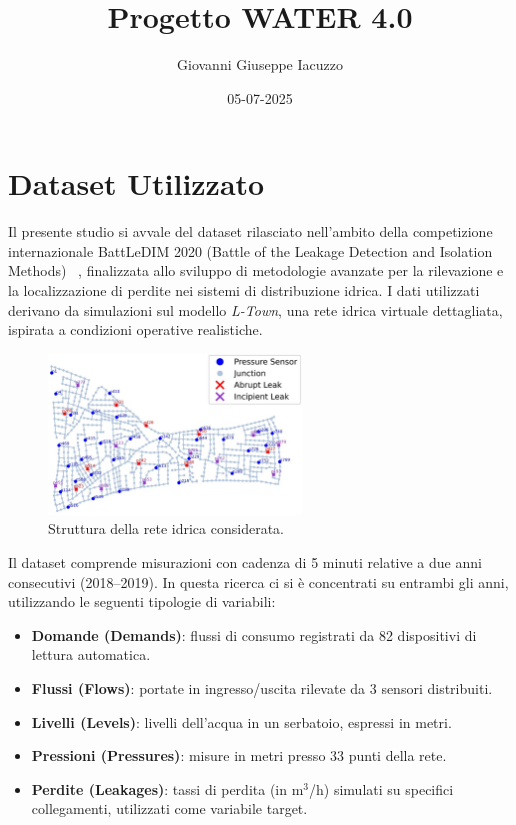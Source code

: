 \documentclass{article}
\title{Progetto WATER 4.0}
\author{Giovanni Giuseppe Iacuzzo}
\date{05-07-2025}
\begin{document}
\maketitle

\section{Dataset Utilizzato}

Il presente studio si avvale del dataset rilasciato nell'ambito della competizione internazionale BattLeDIM 2020 (Battle of the Leakage Detection and Isolation Methods) ~\cite{battle2020}, finalizzata allo sviluppo di metodologie avanzate per la rilevazione e la localizzazione di perdite nei sistemi di distribuzione idrica. I dati utilizzati derivano da simulazioni sul modello \emph{L-Town}, una rete idrica virtuale dettagliata, ispirata a condizioni operative realistiche.

\begin{figure}[htbp]
    \centering
    \includegraphics[width=0.6\textwidth]{img/struttura della rete.png}
    \caption{Struttura della rete idrica considerata.}
    \label{fig:network_structure}
\end{figure}

Il dataset comprende misurazioni con cadenza di 5 minuti relative a due anni consecutivi (2018--2019). In questa ricerca ci si è concentrati su entrambi gli anni, utilizzando le seguenti tipologie di variabili:
\begin{itemize}
    \item \textbf{Domande (Demands)}: flussi di consumo registrati da 82 dispositivi di lettura automatica.
    \item \textbf{Flussi (Flows)}: portate in ingresso/uscita rilevate da 3 sensori distribuiti.
    \item \textbf{Livelli (Levels)}: livelli dell’acqua in un serbatoio, espressi in metri.
    \item \textbf{Pressioni (Pressures)}: misure in metri presso 33 punti della rete.
    \item \textbf{Perdite (Leakages)}: tassi di perdita (in m$^3$/h) simulati su specifici collegamenti, utilizzati come variabile target.
\end{itemize}
\end{document}
